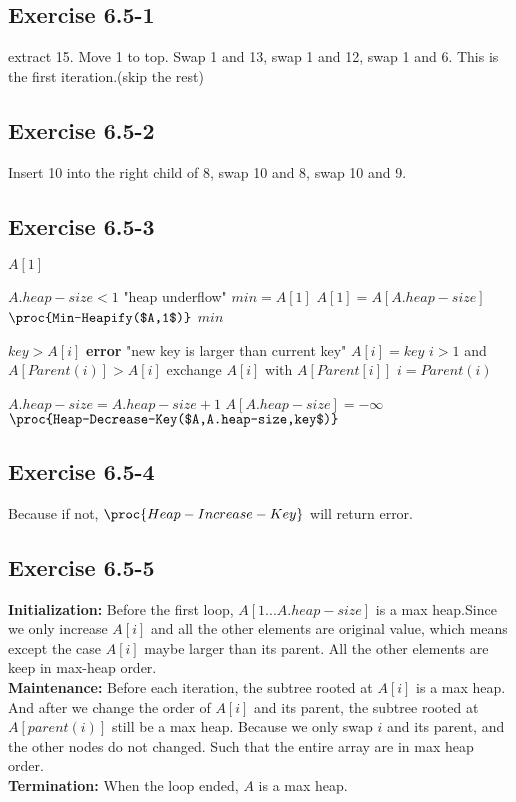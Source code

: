 \documentclass[12pt]{article}
\theoremstyle{definition}
\theoremstyle{remark}
\begin{document}
\subsection*{Exercise 6.5-1}
extract 15. Move 1 to top. Swap 1 and 13, swap 1 and 12, swap 1 and 6. This is the first iteration.(skip the rest)
\subsection*{Exercise 6.5-2}
Insert 10 into the right child of 8, swap 10 and 8, swap 10 and 9.
\subsection*{Exercise 6.5-3}
\begin{codebox}
\li \Return $A[1]$
\end{codebox}
\begin{codebox}
\li \If $A.heap-size<1$
\li \quad \Return "heap underflow"
\li $min=A[1]$
\li $A[1]=A[A.heap-size]$
\li $\proc{Min-Heapify($A,1$)}$
\li \Return $min$
\end{codebox}
\begin{codebox}
\li \If $key>A[i]$
\li \quad \textbf{error} "new key is larger than current key"
\li $A[i]=key$
\li \While $i>1$ and $A[Parent(i)]>A[i]$
\li \quad exchange $A[i]$ with $A[Parent[i]]$
\li \quad $i=Parent(i)$
\end{codebox}
\begin{codebox}
\li $A.heap-size=A.heap-size+1$
\li $A[A.heap-size]=-\infty$
\li $\proc{Heap-Decrease-Key($A,A.heap-size,key$)}$
\end{codebox}
\subsection*{Exercise 6.5-4}
Because if not, $\proc{Heap-Increase-Key}$ will return error.
\subsection*{Exercise 6.5-5}
\textbf{Initialization:} Before the first loop, $A[1...A.heap-size]$ is a max heap.Since we only increase $A[i]$ and all the other elements are original value, which means except the case $A[i]$ maybe larger than its parent. All the other elements are keep in max-heap order.\\
\textbf{Maintenance:} Before each iteration, the subtree rooted at $A[i]$ is a max heap. And after we change the order of $A[i]$ and its parent, the subtree rooted at $A[parent(i)]$ still be a max heap. Because we only swap $i$ and its parent, and the other nodes do not changed. Such that the entire array are in max heap order.\\
\textbf{Termination:} When the loop ended, $A$ is a max heap.
\end{document}
